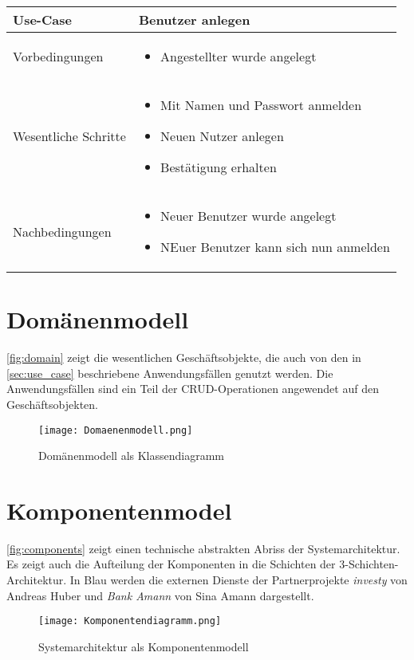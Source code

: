 \documentclass[12pt, a4paper, titlepage]{article}
\begin{document}
\begin{tabular}{|p{}|p{}|}
	\hline
	Use-Case & Benutzer anlegen \\
	\hline
	Vorbedingungen & 
		\begin{itemize}
			\item Angestellter wurde angelegt
		\end{itemize} \\
	\hline
	Wesentliche Schritte &
		\begin{itemize}
			\item Mit Namen und Passwort anmelden
			\item Neuen Nutzer anlegen
			\item Bestätigung erhalten
		\end{itemize} \\
	\hline
	Nachbedingungen &
		\begin{itemize}
			\item Neuer Benutzer wurde angelegt
			\item NEuer Benutzer kann sich nun anmelden
		\end{itemize} \\
	\hline
\end{tabular}

\section{Domänenmodell}
\autoref{fig:domain} zeigt die wesentlichen Geschäftsobjekte, die auch von den
in \autoref{sec:use_case} beschriebene Anwendungsfällen genutzt werden.
Die Anwendungsfällen sind ein Teil der CRUD-Operationen angewendet auf den
Geschäftsobjekten.
\begin{figure}[H]
	\centering
    \texttt{[image: Domaenenmodell.png]}
	\caption{Domänenmodell als Klassendiagramm}
	\label{fig:domain}
\end{figure}

\section{Komponentenmodel}
\autoref{fig:components} zeigt einen technische abstrakten Abriss der
Systemarchitektur. Es zeigt auch die Aufteilung der Komponenten in die
Schichten der 3-Schichten-Architektur. In Blau werden die externen Dienste
der Partnerprojekte \textit{investy} von Andreas Huber und \textit{Bank Amann}
von Sina Amann dargestellt.
\begin{figure}[H]
	\centering
    \texttt{[image: Komponentendiagramm.png]}
	\caption{Systemarchitektur als Komponentenmodell}
	\label{fig:components}
\end{figure}
\end{document}
